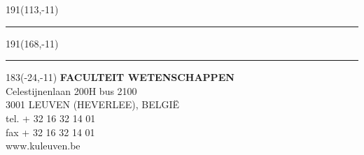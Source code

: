 \documentclass[12pt,a4paper,oneside]{reedthesis}
\begin{document}
\newpage
\thispagestyle{empty}
\sffamily
%
\begin{textblock}{191}(113,-11)
{\color{blueline}\rule{160pt}{5.5pt}}
\end{textblock}
%
\begin{textblock}{191}(168,-11)
{\color{blueline}\rule{5.5pt}{59pt}}
\end{textblock}
%
\begin{textblock}{183}(-24,-11)
\textblockcolour{}
\flushright
\fontsize{7}{7.5}\selectfont
\textbf{FACULTEIT WETENSCHAPPEN}\\
Celestijnenlaan 200H bus 2100\\
3001 LEUVEN (HEVERLEE), BELGI\"{E}\\
tel. + 32 16 32 14 01\\
fax + 32 16 32 14 01\\
www.kuleuven.be\\
\end{textblock}
%
\end{document}
